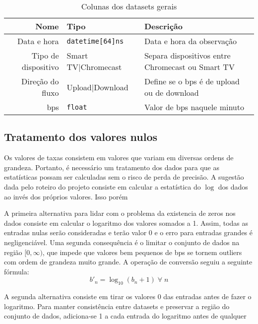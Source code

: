\documentclass{article}
\begin{document}
\begin{table}[h]
	\centering
	\begin{tabular}{rll}
		\toprule
		Nome                & Tipo                    & Descrição                                        \\
		\midrule
		Data e hora         & \texttt{datetime[64]ns} & Data e hora da observação                        \\
		Tipo de dispositivo & Smart TV|Chromecast     & Separa dispositivos entre Chromecast ou Smart TV \\
		Direção do fluxo    & Upload|Download         & Define se o bps é de upload ou de download       \\
		bps                 & \texttt{float}          & Valor de bps naquele minuto                      \\
	\end{tabular}
	\caption{Colunas dos datasets gerais}
	\label{tab:colunas_dataset}
\end{table}


\subsection{Tratamento dos valores nulos}

Os valores de taxas consistem em valores que variam em diversas ordens de grandeza. Portanto, é necessário um tratamento dos dados para que as estatísticas possam ser calculadas sem o risco de perda de precisão. A sugestão dada pelo roteiro do projeto consiste em calcular a estatística do $\log$ dos dados ao invés dos próprios valores. Isso porém

A primeira alternativa para lidar com o problema da existencia de zeros nos dados consiste em calcular o logaritmo dos valores somados a 1. Assim, todas as entradas nulas serão consideradas e terão valor 0 e o erro para entradas grandes é negligenciável. Uma segunda consequência é o limitar o conjunto de dados na região $[0,\infty)$, que impede que valores bem pequenos de bps se tornem outliers com ordem de grandeza muito grande. A operação de conversão seguiu a seguinte fórmula:
\begin{equation*}
	b'_n = \log_{10}(b_n+1)\;\forall\;n
\end{equation*}

A segunda alternativa consiste em tirar os valores 0 das entradas antes de fazer o logaritmo. Para manter consistência entre datasets e preservar a região do conjunto de dados, adiciona-se 1 a cada entrada do logaritmo antes de qualquer
\end{document}
